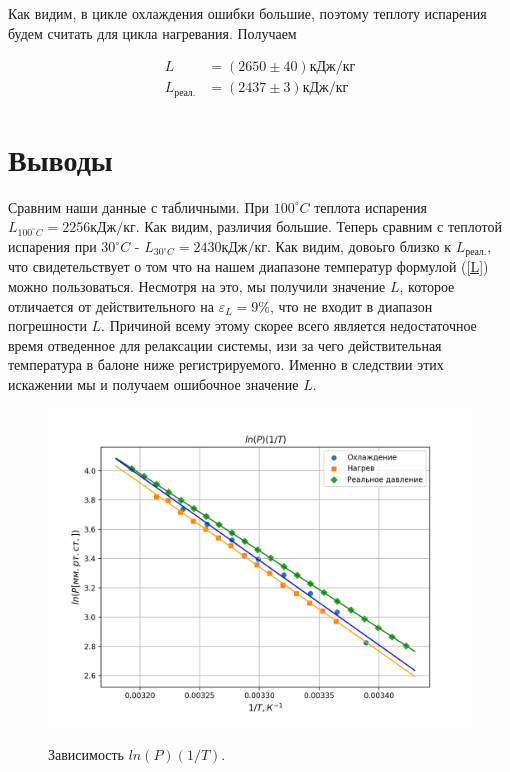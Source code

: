 \documentclass[a4paper, 12pt]{article}
\begin{document}
    Как видим, в цикле охлаждения ошибки большие, поэтому теплоту испарения будем считать для цикла нагревания. Получаем

    \begin{align}
        L &= (2650 \pm 40)кДж/кг\\
        L_{реал.} &= (2437 \pm 3)кДж/кг
    \end{align}

    \section{Выводы}
    Сравним наши данные с табличными. При $100 ^\circ C$ теплота испарения $L_{100^\circ C}=2256кДж/кг$. Как видим, различия большие. Теперь сравним с теплотой испарения при $30 ^\circ C$ - $L_{30 ^\circ C}=2430кДж/кг$. Как видим, довоьго близко к $L_{реал.}$, что свидетельствует о том что на нашем диапазоне температур формулой (\ref{L}) можно пользоваться. Несмотря на это, мы получили значение $L$, которое отличается от действительного на $\varepsilon_L = 9\%$, что не входит в диапазон погрешности $L$. Причиной всему этому скорее всего является недостаточное время отведенное для релаксации системы, изи за чего действительная температура в балоне ниже регистрируемого. Именно в следствии этих искажении мы и получаем ошибочное значение $L$.



    \begin{figure}
        \includegraphics[width=1\textwidth]{lnP}
        \label{lnP}
        \caption{Зависимость $ln(P) (1/T)$.}
    \end{figure}
\end{document}
